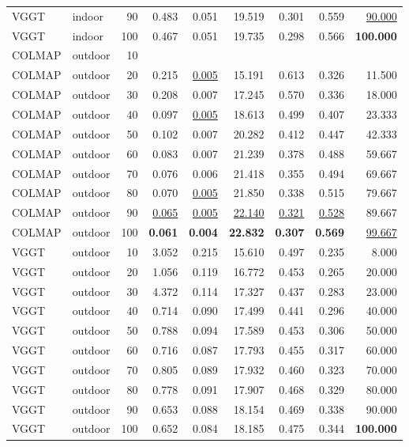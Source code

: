 \begin{table}[H]
\begin{tabular}{llrrrrrrr}
VGGT & indoor & 90 & 0.483 & 0.051 & 19.519 & 0.301 & 0.559 & \underline{90.000} \\
VGGT & indoor & 100 & 0.467 & 0.051 & 19.735 & 0.298 & 0.566 & \textbf{100.000} \\
\midrule
COLMAP & outdoor & 10 &  &  &  &  &  &  \\
COLMAP & outdoor & 20 & 0.215 & \underline{0.005} & 15.191 & 0.613 & 0.326 & 11.500 \\
COLMAP & outdoor & 30 & 0.208 & 0.007 & 17.245 & 0.570 & 0.336 & 18.000 \\
COLMAP & outdoor & 40 & 0.097 & \underline{0.005} & 18.613 & 0.499 & 0.407 & 23.333 \\
COLMAP & outdoor & 50 & 0.102 & 0.007 & 20.282 & 0.412 & 0.447 & 42.333 \\
COLMAP & outdoor & 60 & 0.083 & 0.007 & 21.239 & 0.378 & 0.488 & 59.667 \\
COLMAP & outdoor & 70 & 0.076 & 0.006 & 21.418 & 0.355 & 0.494 & 69.667 \\
COLMAP & outdoor & 80 & 0.070 & \underline{0.005} & 21.850 & 0.338 & 0.515 & 79.667 \\
COLMAP & outdoor & 90 & \underline{0.065} & \underline{0.005} & \underline{22.140} & \underline{0.321} & \underline{0.528} & 89.667 \\
COLMAP & outdoor & 100 & \textbf{0.061} & \textbf{0.004} & \textbf{22.832} & \textbf{0.307} & \textbf{0.569} & \underline{99.667} \\
VGGT & outdoor & 10 & 3.052 & 0.215 & 15.610 & 0.497 & 0.235 & 8.000 \\
VGGT & outdoor & 20 & 1.056 & 0.119 & 16.772 & 0.453 & 0.265 & 20.000 \\
VGGT & outdoor & 30 & 4.372 & 0.114 & 17.327 & 0.437 & 0.283 & 23.000 \\
VGGT & outdoor & 40 & 0.714 & 0.090 & 17.499 & 0.441 & 0.296 & 40.000 \\
VGGT & outdoor & 50 & 0.788 & 0.094 & 17.589 & 0.453 & 0.306 & 50.000 \\
VGGT & outdoor & 60 & 0.716 & 0.087 & 17.793 & 0.455 & 0.317 & 60.000 \\
VGGT & outdoor & 70 & 0.805 & 0.089 & 17.932 & 0.460 & 0.323 & 70.000 \\
VGGT & outdoor & 80 & 0.778 & 0.091 & 17.907 & 0.468 & 0.329 & 80.000 \\
VGGT & outdoor & 90 & 0.653 & 0.088 & 18.154 & 0.469 & 0.338 & 90.000 \\
VGGT & outdoor & 100 & 0.652 & 0.084 & 18.185 & 0.475 & 0.344 & \textbf{100.000} \\

\end{tabular}
\end{table}
